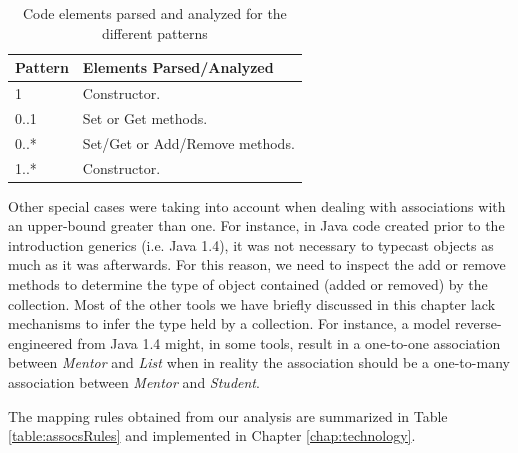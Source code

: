 \begin{table}
\caption{Code elements parsed and analyzed for the different patterns}
\label{table:patternsElements}
\centering
    \begin{tabular}{ll}
		\toprule
		\rowcolor[HTML]{BBDAFF}
        \textbf{Pattern}   & \textbf{Elements Parsed/Analyzed}   \\ 
        \hline
		1  &     Constructor. \\ 
		0..1 &  Set or Get methods. \\ 
		0..* &  Set/Get or Add/Remove methods.\\ 
		1..*  & Constructor.\\ 
        \hline
    \end{tabular}
\end{table}

Other special cases were taking into account when dealing with associations with an upper-bound greater than one. For instance, in Java code created prior to the introduction generics (i.e. Java 1.4), it was not necessary to typecast  objects as much as it was afterwards. For this reason, we need to inspect the add or remove methods to determine the type of object contained (added or removed) by the collection. Most of the other tools we have briefly discussed in this chapter lack mechanisms to infer the type held by a collection.
For instance, a model reverse-engineered from Java 1.4 might, in some tools, result in a one-to-one association between \textit{Mentor} and \textit{List} when in reality the association should be a one-to-many association between \textit{Mentor} and \textit{Student}.

The mapping rules obtained from our analysis are summarized in Table \ref{table:assocsRules} and implemented in Chapter \ref{chap:technology}. 

